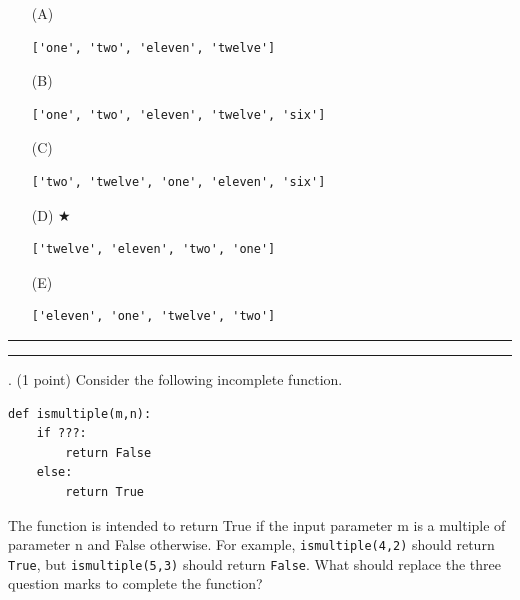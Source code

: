 \documentclass{article}
\newcounter{question}
\begin{document}
\begin{enumerate}
\item[(A)]
\begin{verbatim}['one', 'two', 'eleven', 'twelve']\end{verbatim}

\item[(B)]
\begin{verbatim}['one', 'two', 'eleven', 'twelve', 'six']\end{verbatim}

\item[(C)]
\begin{verbatim}['two', 'twelve', 'one', 'eleven', 'six']\end{verbatim}

\item[(D)] $\bigstar$ 
\begin{verbatim}['twelve', 'eleven', 'two', 'one']\end{verbatim}

\item[(E)]
\begin{verbatim}['eleven', 'one', 'twelve', 'two']\end{verbatim}

\end{enumerate}

\vspace*{2em}
\hrule
\vspace{2em}

\vspace{2em}
\hrule height 2pt


\newpage
{}. (1 point)
Consider the following incomplete function.
\begin{verbatim}
def ismultiple(m,n):
    if ???:
        return False
    else:
        return True
\end{verbatim}
The function is intended to return True if the input parameter m is a multiple of parameter n and False otherwise. For example, \verb|ismultiple(4,2)| should return \verb|True|, but \verb|ismultiple(5,3)| should return \verb|False|. What should replace the three question marks to complete the function?


\end{document}
